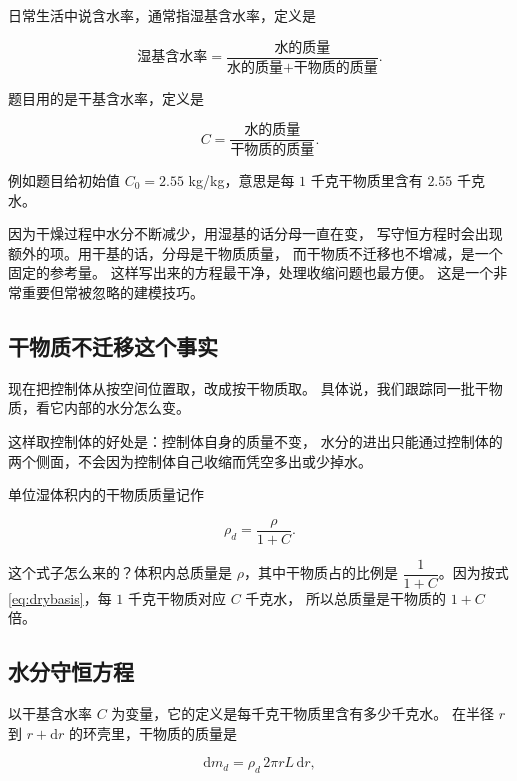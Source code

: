 日常生活中说含水率，通常指湿基含水率，定义是

\begin{equation}
\text{湿基含水率} = \frac{\text{水的质量}}{\text{水的质量}+\text{干物质的质量}} .
\end{equation}

题目用的是干基含水率，定义是

\begin{equation}
C = \frac{\text{水的质量}}{\text{干物质的质量}} .
\label{eq:drybasis}
\end{equation}

例如题目给初始值 $C_0=2.55$ kg/kg，意思是每 $1$ 千克干物质里含有 $2.55$ 千克水。

因为干燥过程中水分不断减少，用湿基的话分母一直在变，
写守恒方程时会出现额外的项。用干基的话，分母是干物质质量，
而干物质不迁移也不增减，是一个固定的参考量。
这样写出来的方程最干净，处理收缩问题也最方便。
这是一个非常重要但常被忽略的建模技巧。

\subsection{干物质不迁移这个事实}

现在把控制体从按空间位置取，改成按干物质取。
具体说，我们跟踪同一批干物质，看它内部的水分怎么变。

这样取控制体的好处是：控制体自身的质量不变，
水分的进出只能通过控制体的两个侧面，不会因为控制体自己收缩而凭空多出或少掉水。

单位湿体积内的干物质质量记作

\begin{equation}
\rho_d = \frac{\rho}{1+C}.
\end{equation}

这个式子怎么来的？体积内总质量是 $\rho$，其中干物质占的比例是
$\dfrac{1}{1+C}$。因为按式 \eqref{eq:drybasis}，每 $1$ 千克干物质对应 $C$ 千克水，
所以总质量是干物质的 $1+C$ 倍。

\subsection{水分守恒方程}

以干基含水率 $C$ 为变量，它的定义是每千克干物质里含有多少千克水。
在半径 $r$ 到 $r+\mathrm{d}r$ 的环壳里，干物质的质量是

\begin{equation}
\mathrm{d}m_d = \rho_d\,2\pi r L\,\mathrm{d}r ,
\end{equation}

